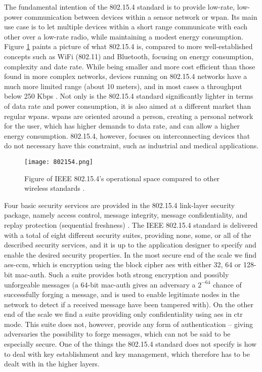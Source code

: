 The fundamental intention of the 802.15.4 standard is to provide low-rate, low-power communication between devices within a sensor network or \gls{wpan}. Its main use case is to let multiple devices within a short range communicate with each other over a low-rate radio, while maintaining a modest energy consumption. Figure \ref{fig:802154-figure} paints a picture of what 802.15.4 is, compared to more well-established concepts such as WiFi (802.11) and Bluetooth, focusing on energy consumption, complexity and date rate. While being smaller and more cost efficient than those found in more complex networks, devices running on 802.15.4 networks have a much more limited range (about 10 meters), and in most cases a throughput below 250 Kbps \cite{gutierrez2001ieee}. Not only is the 802.15.4 standard significantly lighter in terms of data rate and power consumption, it is also aimed at a different market than regular \gls{wpan}s. \gls{wpan}s are oriented around a person, creating a personal network for the user, which has higher demands to data rate, and can allow a higher energy consumption. 802.15.4, however, focuses on interconnecting devices that do not necessary have this constraint, such as industrial and medical applications. 


\begin{figure}[h]
	\centering
	\texttt{[image: 802154.png]}
	\caption{Figure of IEEE 802.15.4's operational space compared to other wireless standards \cite{gutierrez2001ieee}.}
	\label{fig:802154-figure}
\end{figure}

Four basic security services are provided in the 802.15.4 link-layer security package, namely access control, message integrity, message confidentiality, and replay protection (sequential freshness) \cite{sastry2004security}. The IEEE 802.15.4 standard is delivered with a total of eight different security suites, providing none, some, or all of the described security services, and it is up to the application designer to specify and enable the desired security properties. In the most secure end of the scale we find \gls{aes}-\gls{ccm}, which is encryption using the block cipher \gls{aes} with either 32, 64 or 128-bit \gls{mac-auth}. Such a suite provides both strong encryption and possibly unforgeable messages (a 64-bit \gls{mac-auth} gives an adversary a $2^{-64}$ chance of successfully forging a message, and is used to enable legitimate nodes in the network to detect if a received message have been tampered with). On the other end of the scale we find a suite providing only confidentiality using \gls{aes} in \gls{ctr} mode. This suite does not, however, provide any form of authentication -- giving adversaries the possibility to forge messages, which can not be said to be especially secure. One of the things the 802.15.4 standard does not specify is how to deal with key establishment and key management, which therefore has to be dealt with in the higher layers.


